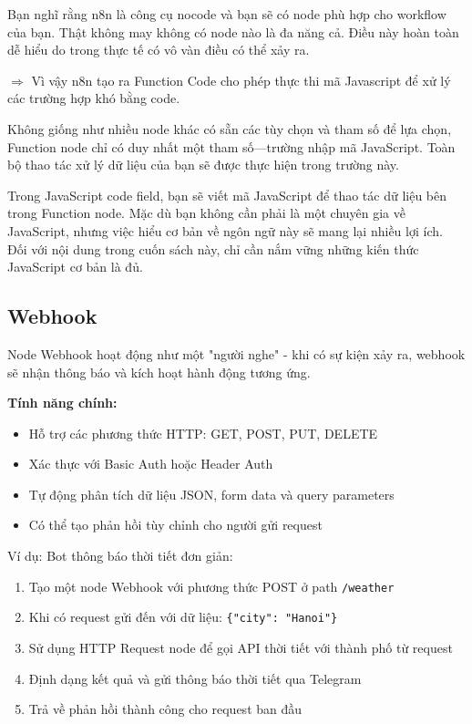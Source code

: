 Bạn nghĩ rằng n8n là công cụ nocode và bạn sẽ có node phù hợp cho workflow của bạn. Thật không may không có node nào là đa năng cả. Điều này hoàn toàn dễ hiểu do trong thực tế có vô vàn điều có thể xảy ra. 

$\Rightarrow$ Vì vậy n8n tạo ra Function Code cho phép thực thi mã Javascript để xử lý các trường hợp khó bằng code. 

Không giống như nhiều node khác có sẵn các tùy chọn và tham số để lựa chọn, Function node chỉ có duy nhất một tham số—trường nhập mã JavaScript. Toàn bộ thao tác xử lý dữ liệu của bạn sẽ được thực hiện trong trường này.

Trong JavaScript code field, bạn sẽ viết mã JavaScript để thao tác dữ liệu bên trong Function node.
Mặc dù bạn không cần phải là một chuyên gia về JavaScript, nhưng việc hiểu cơ bản về ngôn ngữ này sẽ mang lại nhiều lợi ích. Đối với nội dung trong cuốn sách này, chỉ cần nắm vững những kiến thức JavaScript cơ bản là đủ.


\subsection{Webhook}
Node Webhook hoạt động như một "người nghe" - khi có sự kiện xảy ra, webhook sẽ nhận thông báo và kích hoạt hành động tương ứng.

\textbf{Tính năng chính:}

\begin{itemize}
    \item Hỗ trợ các phương thức HTTP: GET, POST, PUT, DELETE
    \item Xác thực với Basic Auth hoặc Header Auth  
    \item Tự động phân tích dữ liệu JSON, form data và query parameters
    \item Có thể tạo phản hồi tùy chỉnh cho người gửi request
\end{itemize}

Ví dụ: Bot thông báo thời tiết đơn giản:

\begin{enumerate}
    \item Tạo một node Webhook với phương thức POST ở path \texttt{/weather}
    \item Khi có request gửi đến với dữ liệu: \texttt{\{"city": "Hanoi"\}}
    \item Sử dụng HTTP Request node để gọi API thời tiết với thành phố từ request
    \item Định dạng kết quả và gửi thông báo thời tiết qua Telegram
    \item Trả về phản hồi thành công cho request ban đầu
\end{enumerate}

